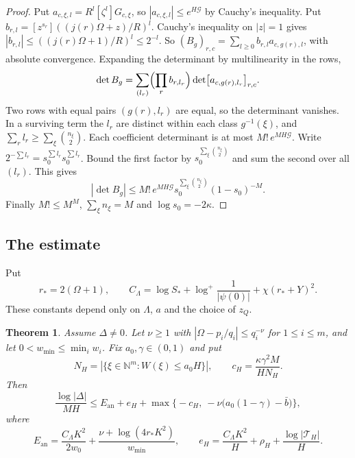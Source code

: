 \documentclass[11pt]{amsart}
\newtheorem{theorem}{Theorem}[section]
\theoremstyle{definition}
\theoremstyle{remark}
\numberwithin{equation}{section}
\newcommand{\N}{\mathbb N}
\newcommand{\Ean}{E_{\mathrm{an}}}
\newcommand{\cT}{\mathcal T}
\newcommand{\cG}{\mathcal G}
\newcommand{\bb}{\bar b}
\begin{document}
\begin{proof}
Put $a_{c,\xi,l}=R^l[\zeta^l]G_{c,\xi}$, so $|a_{c,\xi,l}|\le e^{H\cG}$ by Cauchy's inequality. Put
$b_{r,l}=[z^{s_r}]((j(r)\Omega+z)/R)^l$. Cauchy's inequality on $|z|=1$ gives
$|b_{r,l}|\le((j(r)\Omega+1)/R)^l\le2^{-l}$. So
$(B_g)_{r,c}=\sum_{l\ge0}b_{r,l}a_{c,g(r),l}$, with absolute convergence. Expanding the determinant by
multilinearity in the rows,
\[
 \det B_g=\sum_{(l_r)}\Bigl(\prod_rb_{r,l_r}\Bigr)\det\bigl[a_{c,g(r),l_r}\bigr]_{r,c}.
\]
Two rows with equal pairs $(g(r),l_r)$ are equal, so the determinant vanishes. In a surviving term the $l_r$ are
distinct within each class $g^{-1}(\xi)$, and $\sum_rl_r\ge\sum_\xi\binom{n_\xi}2$. Each coefficient
determinant is at most $M!\,e^{MH\cG}$. Write $2^{-\sum l_r}=s_0^{\sum l_r}s_0^{\sum l_r}$. Bound the first
factor by $s_0^{\sum_\xi\binom{n_\xi}2}$ and sum the second over all $(l_r)$. This gives
\[
 |\det B_g|\le M!\,e^{MH\cG}s_0^{\sum_\xi\binom{n_\xi}2}(1-s_0)^{-M}.
\]
Finally $M!\le M^M$, $\sum_\xi n_\xi=M$ and $\log s_0=-2\kappa$.
\end{proof}

\subsection{The estimate}
Put
\[
 r_*=2(\Omega+1),\qquad C_\Lambda=\log S_*+\log^+\frac1{|\psi(0)|}+\chi(r_*+Y)^2.
\]
These constants depend only on $\Lambda$, $a$ and the choice of $z_Q$.

\begin{theorem}\label{thm:analytic}
Assume $\Delta\ne0$. Let $\nu\ge1$ with $|\Omega-p_i/q_i|\le q_i^{-\nu}$ for $1\le i\le m$, and let
$0<w_{\min}\le\min_iw_i$. Fix $a_0,\gamma\in(0,1)$ and put
\[
 N_H=|\{\xi\in\N^m:W(\xi)\le a_0H\}|,\qquad c_H=\frac{\kappa\gamma^2M}{HN_H}.
\]
Then
\[
 \frac{\log|\Delta|}{MH}\le\Ean+e_H+\max\bigl\{-c_H,\ -\nu\bigl(a_0(1-\gamma)-\bb\bigr)\bigr\},
\]
where
\[
 \Ean=\frac{C_\Lambda K^2}{2w_0}+\frac{\nu+\log(4r_*K^2)}{w_{\min}},\qquad
 e_H=\frac{C_\Lambda K^2}H+\rho_H+\frac{\log|\cT_H|}H.
\]
\end{theorem}
\end{document}
